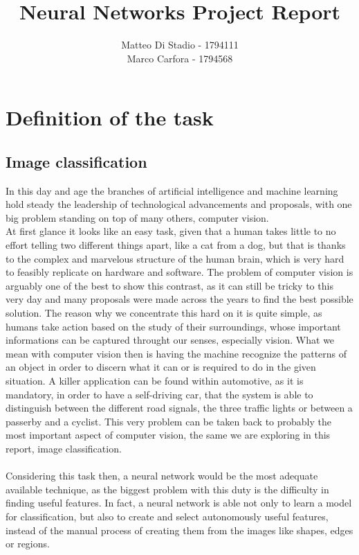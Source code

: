\documentclass[12pt,a4paper]{report}
\author{Matteo Di Stadio - 1794111\\Marco Carfora - 1794568}
\title{Neural Networks Project Report}
\date{}
\begin{document}
\maketitle

\tableofcontents



\chapter{Definition of the task}

\section{Image classification}
In this day and age the branches of artificial intelligence and machine learning hold steady the leadership of technological advancements and proposals, with one big problem standing on top of many others, computer vision. \\
At first glance it looks like an easy task, given that a human takes little to no effort telling two different things apart, like a cat from a dog, but that is thanks to the complex and marvelous structure of the human brain, which is very hard to feasibly replicate on hardware and software. The problem of computer vision is arguably one of the best to show this contrast, as it can still be tricky to this very day and many proposals were made across the years to find the best possible solution. The reason why we concentrate this hard on it is quite simple, as humans take action based on the study of their surroundings, whose important informations can be captured throught our senses, especially vision. What we mean with computer vision then is having the machine recognize the patterns of an object in order to discern what it can or is required to do in the given situation. A killer application can be found within automotive, as it is mandatory, in order to have a self-driving car, that the system is able to distinguish between the different road signals, the three traffic lights or between a passerby and a cyclist. This very problem can be taken back to probably the most important aspect of computer vision, the same we are exploring in this report, image classification. \\ \\
Considering this task then, a neural network would be the most adequate available technique, as the biggest problem with this duty is the difficulty in finding useful features. In fact, a neural network is able not only to learn a model for classification, but also to create and select autonomously useful features, instead of the manual process of creating them
from the images like shapes, edges or regions. 
\end{document}
